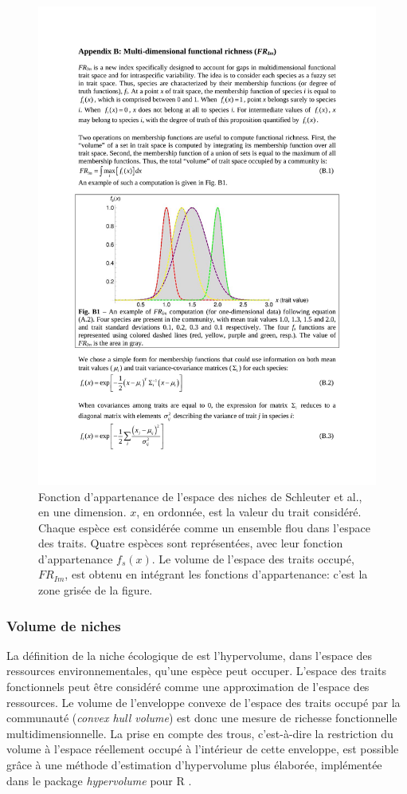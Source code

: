 \documentclass[
  11pt,
  french,
  a4paper,
  extrafontsizes,onecolumn,openright
  ]{memoir}
\begin{document}
\begin{figure}

{\centering \includegraphics[width=0.8\linewidth]{images/Schleuter2010} 

}

\caption{Fonction d'appartenance de l'espace des niches de Schleuter et al., en une dimension. \(x\), en ordonnée, est la valeur du trait considéré. Chaque espèce est considérée comme un ensemble flou dans l'espace des traits. Quatre espèces sont représentées, avec leur fonction d'appartenance \(f_s(x)\). Le volume de l'espace des traits occupé, \(\mathit{FR}_{Im}\), est obtenu en intégrant les fonctions d'appartenance: c'est la zone grisée de la figure.}\label{fig:Schleuter2010}
\end{figure}

\normalsize

\subsubsection{Volume de niches}\label{volume-de-niches}

La définition de la niche écologique de \textcite{Hutchinson1957} est l'hypervolume, dans l'espace des ressources environnementales, qu'une espèce peut occuper.
L'espace des traits fonctionnels peut être considéré comme une approximation de l'espace des ressources.
Le volume de l'enveloppe convexe de l'espace des traits occupé par la communauté (\emph{convex hull volume}) est donc une mesure de richesse fonctionnelle multidimensionnelle.
La prise en compte des trous, c'est-à-dire la restriction du volume à l'espace réellement occupé à l'intérieur de cette enveloppe, est possible grâce à une méthode d'estimation d'hypervolume plus élaborée, implémentée dans le package \emph{hypervolume} pour R \autocite{Blonder2014}.
\end{document}

